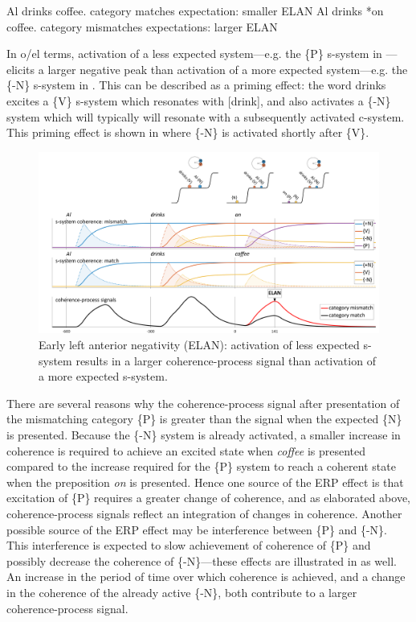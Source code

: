 \ea\label{ex:6:23}
\ea\label{ex:6:23a} Al drinks coffee. \hspace{3mm} category matches expectation: smaller ELAN
\ex\label{ex:6:23b} Al drinks *on coffee. \hspace{3mm} category mismatches expectations: larger ELAN
\z
\z

In o/el terms, activation of a less expected system—e.g. the \{P\} s-system in —elicits a larger negative peak than activation of a more expected system—e.g. the \{-N\} s-system in . This can be described as a priming effect: the word drinks excites a \{V\} s-system which resonates with [drink], and also activates a \{-N\} system which will typically will resonate with a subsequently activated c-system. This priming effect is shown in {} where \{-N\} is activated shortly after \{V\}. 

  
\begin{figure}
\includegraphics[width=\textwidth]{figures/Tilsen-img142.png}
\caption{Early left anterior negativity (ELAN): activation of less expected s-system results in a larger coherence-process signal than activation of a more expected s-system.}
\label{fig:6:23}
\end{figure}
 

There are several reasons why the coherence-process signal after presentation of the mismatching category \{P\} is greater than the signal when the expected \{N\} is presented. Because the \{-N\} system is already activated, a smaller increase in coherence is required to achieve an excited state when \textit{coffee} is presented compared to the increase required for the \{P\} system to reach a coherent state when the preposition \textit{on} is presented. Hence one source of the ERP effect is that excitation of \{P\} requires a greater change of coherence, and as elaborated above, coherence-process signals reflect an integration of changes in coherence. Another possible source of the ERP effect may be interference between \{P\} and \{-N\}. This interference is expected to slow achievement of coherence of \{P\} and possibly decrease the coherence of \{-N\}—these effects are illustrated in {} as well. An increase in the period of time over which coherence is achieved, and a change in the coherence of the already active \{-N\}, both contribute to a larger coherence-process signal.

